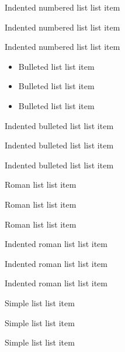 \begin{enumerate-indent}
	\item Indented numbered list list item
	\item Indented numbered list list item
	\item Indented numbered list list item
\end{enumerate-indent}

\begin{itemize}
	\item Bulleted list list item
    \item Bulleted list list item
    \item Bulleted list list item
\end{itemize}

\begin{itemize-indent}
    \item Indented bulleted list list item
    \item Indented bulleted list list item
    \item Indented bulleted list list item
\end{itemize-indent}

\begin{romanlist}
    \item Roman list list item
    \item Roman list list item
    \item Roman list list item
\end{romanlist}

\begin{romanlist-indent}
    \item Indented roman list list item
    \item Indented roman list list item
    \item Indented roman list list item
\end{romanlist-indent}

\begin{simplelist}
    \item Simple list list item
    \item Simple list list item
    \item Simple list list item
\end{simplelist}

